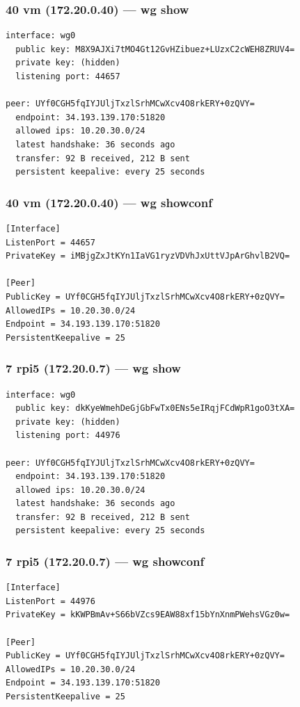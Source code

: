 \documentclass[11pt,a4paper]{article}
\begin{document}
\subsubsection*{40 vm (172.20.0.40) — wg show}
\begin{lstlisting}
interface: wg0
  public key: M8X9AJXi7tMO4Gt12GvHZibuez+LUzxC2cWEH8ZRUV4=
  private key: (hidden)
  listening port: 44657

peer: UYf0CGH5fqIYJUljTxzlSrhMCwXcv4O8rkERY+0zQVY=
  endpoint: 34.193.139.170:51820
  allowed ips: 10.20.30.0/24
  latest handshake: 36 seconds ago
  transfer: 92 B received, 212 B sent
  persistent keepalive: every 25 seconds

\end{lstlisting}

\subsubsection*{40 vm (172.20.0.40) — wg showconf}
\begin{lstlisting}
[Interface]
ListenPort = 44657
PrivateKey = iMBjgZxJtKYn1IaVG1ryzVDVhJxUttVJpArGhvlB2VQ=

[Peer]
PublicKey = UYf0CGH5fqIYJUljTxzlSrhMCwXcv4O8rkERY+0zQVY=
AllowedIPs = 10.20.30.0/24
Endpoint = 34.193.139.170:51820
PersistentKeepalive = 25

\end{lstlisting}

\subsubsection*{7 rpi5 (172.20.0.7) — wg show}
\begin{lstlisting}
interface: wg0
  public key: dkKyeWmehDeGjGbFwTx0ENs5eIRqjFCdWpR1goO3tXA=
  private key: (hidden)
  listening port: 44976

peer: UYf0CGH5fqIYJUljTxzlSrhMCwXcv4O8rkERY+0zQVY=
  endpoint: 34.193.139.170:51820
  allowed ips: 10.20.30.0/24
  latest handshake: 36 seconds ago
  transfer: 92 B received, 212 B sent
  persistent keepalive: every 25 seconds

\end{lstlisting}

\subsubsection*{7 rpi5 (172.20.0.7) — wg showconf}
\begin{lstlisting}
[Interface]
ListenPort = 44976
PrivateKey = kKWPBmAv+S66bVZcs9EAW88xf15bYnXnmPWehsVGz0w=

[Peer]
PublicKey = UYf0CGH5fqIYJUljTxzlSrhMCwXcv4O8rkERY+0zQVY=
AllowedIPs = 10.20.30.0/24
Endpoint = 34.193.139.170:51820
PersistentKeepalive = 25

\end{lstlisting}
\end{document}
